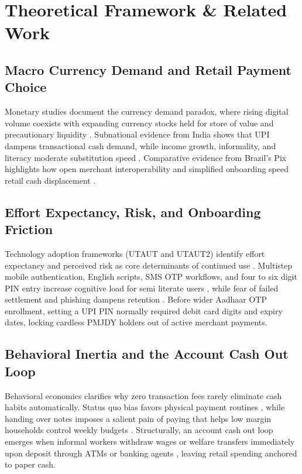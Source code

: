 \documentclass[conference]{IEEEtran}
\begin{document}
\section{Theoretical Framework \& Related Work}

\subsection{Macro Currency Demand and Retail Payment Choice}
Monetary studies document the currency demand paradox, where rising digital volume coexists with expanding currency stocks held for store of value and precautionary liquidity \cite{ashworth2020, arango2015, awasthy2022}. Subnational evidence from India shows that UPI dampens transactional cash demand, while income growth, informality, and literacy moderate substitution speed \cite{awasthy2025}. Comparative evidence from Brazil's Pix highlights how open merchant interoperability and simplified onboarding speed retail cash displacement \cite{duarte2022}.

\subsection{Effort Expectancy, Risk, and Onboarding Friction}
Technology adoption frameworks (UTAUT and UTAUT2) identify effort expectancy and perceived risk as core determinants of continued use \cite{venkatesh2003, venkatesh2012, slade2015, oliveira2016}. Multistep mobile authentication, English scripts, SMS OTP workflows, and four to six digit PIN entry increase cognitive load for semi literate users \cite{migliore2022}, while fear of failed settlement and phishing dampens retention \cite{talwar2020}. Before wider Aadhaar OTP enrollment, setting a UPI PIN normally required debit card digits and expiry dates, locking cardless PMJDY holders out of active merchant payments.

\subsection{Behavioral Inertia and the Account Cash Out Loop}
Behavioral economics clarifies why zero transaction fees rarely eliminate cash habits automatically. Status quo bias favors physical payment routines \cite{samuelson1988}, while handing over notes imposes a salient pain of paying that helps low margin households control weekly budgets \cite{prelec1998, thaler1999, soman2001}. Structurally, an account cash out loop emerges when informal workers withdraw wages or welfare transfers immediately upon deposit through ATMs or banking agents \cite{demirguc2022, hernandez2020, sutradhar2024}, leaving retail spending anchored to paper cash.
\end{document}
